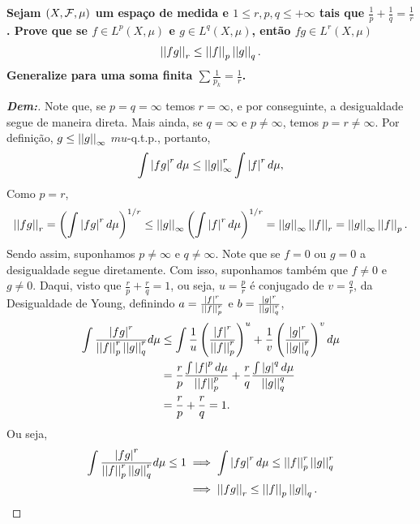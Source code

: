 \textbf{Sejam $(X, \mcal F ,\mu)$ um espaço de medida e 
$1 \le r, p, q \le +\infty$ tais que $\frac{1}{p} + \frac{1}{q} = \frac{1}{r}$. 
Prove que se $f \in L^p(X, \mu)$ e $g \in L^q(X, \mu)$, então $fg \in L^r(X, \mu)$ 
\begin{align*}
  \pnorm r {fg} \le \pnorm p f \pnorm q g.
\end{align*}
Generalize para uma soma finita $\sum \frac{1}{p_k} = \frac{1}{r}$.}
\begin{proof}[\textbf{Dem:}] Note que, se $p = q = \infty$ temos $r = \infty$,
  e por conseguinte, a 
  desigualdade segue de maneira direta. Mais ainda, se $q = \infty$ e $p \neq \infty$,
  temos $p = r \neq \infty$. Por definição, $g \le \pnorm \infty g$ $mu$-q.t.p., 
  portanto, 
  \begin{align*}
    \int \mparth{fg}^r d\mu \le \pnorm \infty g^r \int \mparth{f}^r d\mu, 
  \end{align*}
  Como $p = r$,
  \begin{align*}
    \pnorm r {fg}= \parth{\int \mparth{fg}^r d\mu}^{1/r} 
    \le \pnorm \infty g \parth{\int \mparth{f}^r d\mu}^{1/r} = \pnorm \infty g \pnorm r f 
    = \pnorm \infty g \pnorm p f.
  \end{align*}
  Sendo assim, suponhamos $p \neq \infty$ e $q \neq \infty$. Note que se $f= 0$ ou $g =0$
  a desigualdade segue diretamente. Com isso, suponhamos também que $f\neq 0$ e $g \neq 0$. 
  Daqui, visto que 
  $\frac{r}{p} + \frac{r}{q} = 1$, ou seja, $u = \frac{p}{r}$ é conjugado de 
  $v = \frac{q}{r}$, da Desigualdade de Young, definindo $a = \frac{|f|^r}{\pnorm p f^r}$
  e $b =\frac{|g|^r}{\pnorm q g^r}$,
  \begin{align*}
    \int \frac{\mparth{fg}^r}{\pnorm p f^r \pnorm q g^r} d\mu &\le 
    \int \frac{1}{u}\parth{\frac{\mparth{f}^r}{\pnorm p f^r}}^u +
    \frac{1}{v}\parth{\frac{\mparth{g}^r}{\pnorm q g^r}}^v d\mu \\
    &= \frac{r}{p} \frac{\int \mparth{f}^p d\mu}{\pnorm p f^p}  
    + \frac{r}{q} \frac{\int \mparth{g}^q d\mu}{\pnorm q g^q} \\ 
    &= \frac{r}{p} + \frac{r}{q} = 1. 
  \end{align*}
  Ou seja, 
  \begin{align*}
    \int \frac{\mparth{fg}^r}{\pnorm p f^r \pnorm q g^r} d\mu \le 1 
    &\implies \int \mparth{fg}^r d\mu \le \pnorm p f^r \pnorm q g^r \\
    &\implies \pnorm r {fg} \le \pnorm p f \pnorm q g. 
  \end{align*}

\end{proof}
